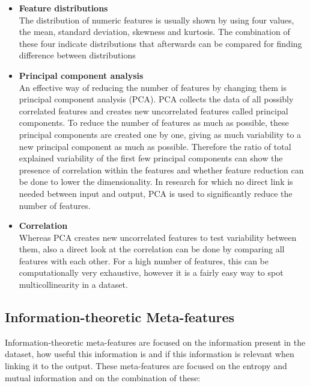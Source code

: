 \documentclass[10pt,a4paper]{report}
\begin{document}
	\begin{itemize}
		\item \textbf{Feature distributions} \\
		The distribution of numeric features is usually shown by using four values, the mean, standard deviation, skewness and kurtosis. The combination of these four indicate distributions that afterwards can be compared for finding difference between distributions
		\item \textbf{Principal component analysis} \\
		An effective way of reducing the number of features by changing them is principal component analysis (PCA). PCA collects the data of all possibly correlated features and creates new uncorrelated features called principal components. To reduce the number of features as much as possible, these principal components are created one by one, giving as much variability to a new principal component as much as possible. Therefore the ratio of total explained variability of the first few principal components can show the presence of correlation within the features and whether feature reduction can be done to lower the dimensionality. In research for which no direct link is needed between input and output, PCA is used to significantly reduce the number of features\cite{wold1987principal}.
		\item \textbf{Correlation} \\
		Whereas PCA creates new uncorrelated features to test variability between them, also a direct look at the correlation can be done by comparing all features with each other\cite{yu2003feature}. For a high number of features, this can be computationally very exhaustive, however it is a fairly easy way to spot multicollinearity in a dataset\cite{hall2000correlation}.
		
	\end{itemize}
	
	\subsection{Information-theoretic Meta-features}
	\label{subsec:InformationTheoreticMF}
	
	Information-theoretic meta-features are focused on the information present in the dataset, how useful this information is and if this information is relevant when linking it to the output. These meta-features are focused on the entropy and mutual information and on the combination of these:
	
\end{document}
